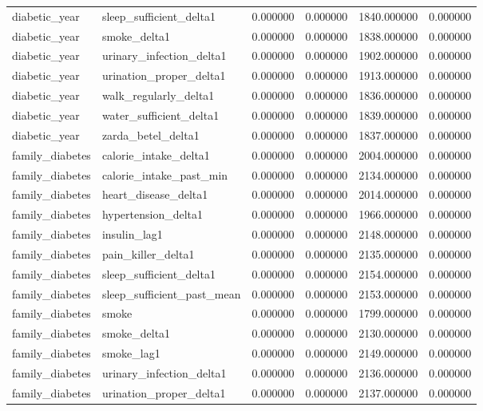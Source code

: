\begin{longtable}{llrrrr}
diabetic\_year & sleep\_sufficient\_delta1 & 0.000000 & 0.000000 & 1840.000000 & 0.000000 \\
diabetic\_year & smoke\_delta1 & 0.000000 & 0.000000 & 1838.000000 & 0.000000 \\
diabetic\_year & urinary\_infection\_delta1 & 0.000000 & 0.000000 & 1902.000000 & 0.000000 \\
diabetic\_year & urination\_proper\_delta1 & 0.000000 & 0.000000 & 1913.000000 & 0.000000 \\
diabetic\_year & walk\_regularly\_delta1 & 0.000000 & 0.000000 & 1836.000000 & 0.000000 \\
diabetic\_year & water\_sufficient\_delta1 & 0.000000 & 0.000000 & 1839.000000 & 0.000000 \\
diabetic\_year & zarda\_betel\_delta1 & 0.000000 & 0.000000 & 1837.000000 & 0.000000 \\
family\_diabetes & calorie\_intake\_delta1 & 0.000000 & 0.000000 & 2004.000000 & 0.000000 \\
family\_diabetes & calorie\_intake\_past\_min & 0.000000 & 0.000000 & 2134.000000 & 0.000000 \\
family\_diabetes & heart\_disease\_delta1 & 0.000000 & 0.000000 & 2014.000000 & 0.000000 \\
family\_diabetes & hypertension\_delta1 & 0.000000 & 0.000000 & 1966.000000 & 0.000000 \\
family\_diabetes & insulin\_lag1 & 0.000000 & 0.000000 & 2148.000000 & 0.000000 \\
family\_diabetes & pain\_killer\_delta1 & 0.000000 & 0.000000 & 2135.000000 & 0.000000 \\
family\_diabetes & sleep\_sufficient\_delta1 & 0.000000 & 0.000000 & 2154.000000 & 0.000000 \\
family\_diabetes & sleep\_sufficient\_past\_mean & 0.000000 & 0.000000 & 2153.000000 & 0.000000 \\
family\_diabetes & smoke & 0.000000 & 0.000000 & 1799.000000 & 0.000000 \\
family\_diabetes & smoke\_delta1 & 0.000000 & 0.000000 & 2130.000000 & 0.000000 \\
family\_diabetes & smoke\_lag1 & 0.000000 & 0.000000 & 2149.000000 & 0.000000 \\
family\_diabetes & urinary\_infection\_delta1 & 0.000000 & 0.000000 & 2136.000000 & 0.000000 \\
family\_diabetes & urination\_proper\_delta1 & 0.000000 & 0.000000 & 2137.000000 & 0.000000 \\

\end{longtable}

